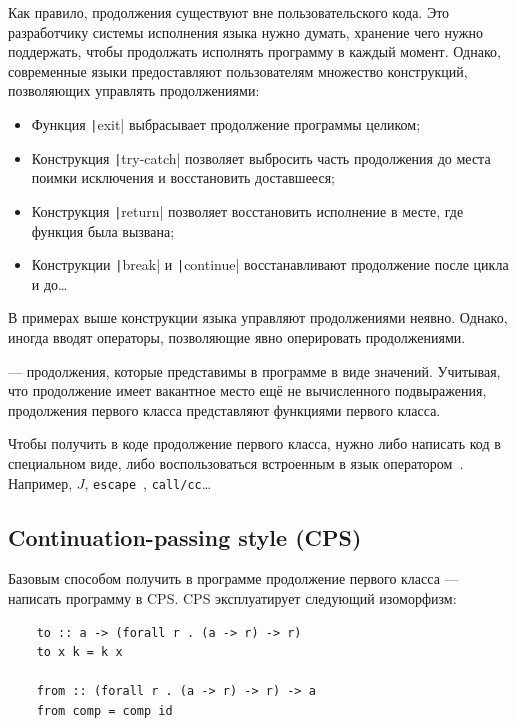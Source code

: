 Как правило, продолжения существуют вне пользовательского кода.
Это разработчику системы исполнения языка нужно думать, хранение чего нужно поддержать, чтобы продолжать исполнять программу в каждый момент.
Однако, современные языки предоставляют пользователям множество конструкций, позволяющих управлять продолжениями:

\begin{itemize}
    \item Функция \texttt|exit| выбрасывает продолжение программы целиком;
    \item Конструкция \texttt|try-catch| позволяет выбросить часть продолжения до места поимки исключения и восстановить доставшееся;
    \item Конструкция \texttt|return| позволяет восстановить исполнение в месте, где функция была вызвана;
    \item Конструкции \texttt|break| и \texttt|continue| восстанавливают продолжение после цикла и до\ldots
\end{itemize}

В примерах выше конструкции языка управляют продолжениями неявно.
Однако, иногда вводят операторы, позволяющие явно оперировать продолжениями.

 --- продолжения, которые представимы в программе в виде значений.
Учитывая, что продолжение имеет вакантное место ещё не вычисленного подвыражения, продолжения первого класса представляют функциями первого класса.

Чтобы получить в коде продолжение первого класса, нужно либо написать код в специальном виде, либо воспользоваться встроенным в язык оператором~\cite[приложение A]{hillerstrom2022foundations}.
Например, $J$, \texttt{escape}~\cite{reynolds1972definitional}, \texttt{call/cc}\ldots

\subsection{Continuation-passing style (CPS)}

Базовым способом получить в программе продолжение первого класса --- написать программу в CPS.
CPS эксплуатирует следующий изоморфизм:
\begin{verbatim}
    to :: a -> (forall r . (a -> r) -> r)
    to x k = k x

    from :: (forall r . (a -> r) -> r) -> a
    from comp = comp id
\end{verbatim}

